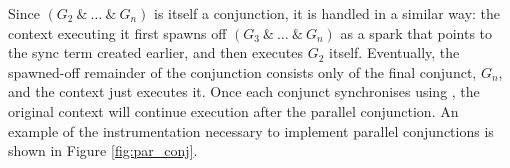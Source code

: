 Since $(G_2~\&~\ldots~\&~G_n)$ is itself a conjunction,
it is handled in a similar way:
the context executing it
first spawns off $(G_3~\&~\ldots~\&~G_n)$ as a spark that points to the sync
term created earlier,
and then executes $G_2$ itself.
Eventually, the spawned-off remainder of the conjunction
consists only of the final conjunct, $G_n$,
and the context just executes it.
Once each conjunct synchronises using {\joinandcontinue},
the original context will continue execution after the parallel conjunction.
An example of the instrumentation necessary to implement parallel
conjunctions is shown in Figure \ref{fig:par_conj}.

